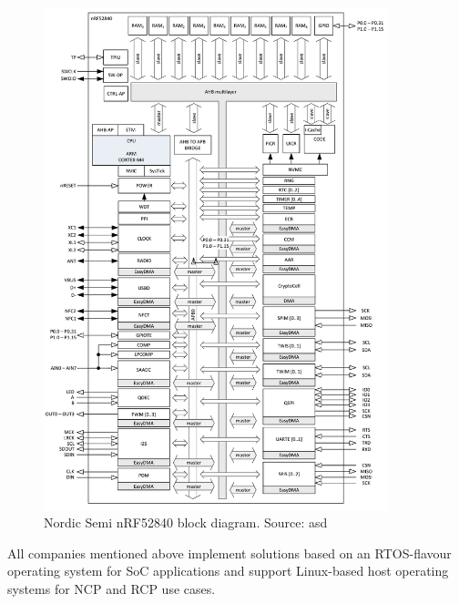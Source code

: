 \begin{figure}
    \centering
    \includegraphics[width=100mm, keepaspectratio]{figures/nordic_nRF52840-block_dia.png}
    \caption*{Nordic Semi nRF52840 block diagram. Source: asd}
    \label{fig:mp:nordic-dia}
\end{figure}

All companies mentioned above implement solutions based on an RTOS-flavour operating system for SoC applications and support Linux-based host operating systems for NCP and RCP use cases.